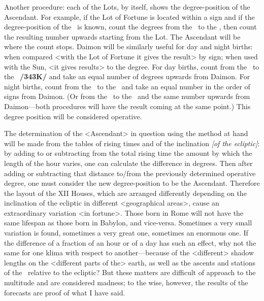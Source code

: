 Another procedure: each of the Lots, by itself, shows the degree-position of the Ascendant. For example, if the Lot of Fortune is located within a sign and if the degree-position of the \Moon\, is known, count the degrees from the \Moon\, to the \Sun, then count the resulting number upwards starting from the Lot. The Ascendant will be where the count stops. Daimon will be similarly useful for day and night births: when compared <with the Lot of Fortune it gives the result> by sign; when used with the Sun, <it gives results> to the degree. For day births, count from the \Sun\, to the \Moon\, \textbf{/343K/} and take an equal number of degrees upwards from Daimon. For night births, count from the \Moon\, to the \Sun\, and take an equal number in the order of signs from Daimon. (Or from the \Sun\, to the \Moon\, and the same number upwards from Daimon—both procedures will have the result coming at the same point.) This degree position will be considered operative.

The determination of the <Ascendant> in question using the method at hand will be made from the tables of rising times and of the inclination \textit{[of the ecliptic]}: by adding to or subtracting from the total rising time the amount by which the length of the hour varies, one can calculate the difference in degrees. Then after adding or subtracting that distance to/from the previously determined operative degree, one must consider the new degree-position to be the Ascendant. Therefore the layout of the XII Houses, which are arranged differently depending on the inclination of the ecliptic in different <geographical areas>, cause an extraordinary variation <in fortune>. Those born in Rome will not have the same lifespan as those born in Babylon, and vice-versa. Sometimes a very small variation is found, sometimes a very great one, sometimes an
enormous one. If the difference of a fraction of an hour or of a day has such an effect, why not the same for one klima with respect to another—because of the <different> shadow lengths on the <different parts of the> earth, as well as the ascents and stations of the \Sun\, relative to the ecliptic? But these matters are difficult of
approach to the multitude and are considered madness; to the wise, however, the results of the forecasts are proof of what I have said.

